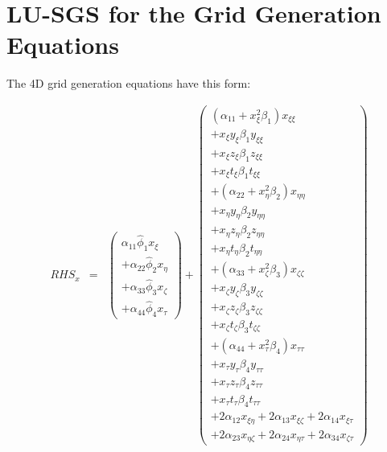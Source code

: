 \section{LU-SGS for the Grid Generation Equations}

The 4D grid generation equations have this form:

\begin{eqnarray}
RHS_x
&=&
\left(
\begin{array}{r}
\alpha_{11} \widehat{\phi}_1 x_{\xi} 
\\
+
\alpha_{22} \widehat{\phi}_2 x_{\eta} 
\\
+
\alpha_{33} \widehat{\phi}_3 x_{\zeta} 
\\
+
\alpha_{44} \widehat{\phi}_4 x_{\tau} 
\end{array}
\right)
+
\left(
\begin{array}{r}
\left(\alpha_{11} + x_{\xi}^2 \beta_1 \right) x_{\xi \xi}
\\
+ x_{\xi} y_{\xi} \beta_1 y_{\xi \xi} 
\\
+ x_{\xi} z_{\xi} \beta_1 z_{\xi \xi} 
\\
+ x_{\xi} t_{\xi} \beta_1 t_{\xi \xi} 
\\
+
\left(\alpha_{22} + x_{\eta}^2 \beta_2 \right) x_{\eta \eta}
\\
+ x_{\eta} y_{\eta} \beta_2 y_{\eta \eta} 
\\
+ x_{\eta} z_{\eta} \beta_2 z_{\eta \eta} 
\\
+ x_{\eta} t_{\eta} \beta_2 t_{\eta \eta} 
\\
+
\left(\alpha_{33} + x_{\zeta}^2 \beta_3 \right) x_{\zeta \zeta}
\\
+ x_{\zeta} y_{\zeta} \beta_3 y_{\zeta \zeta} 
\\
+ x_{\zeta} z_{\zeta} \beta_3 z_{\zeta \zeta} 
\\
+ x_{\zeta} t_{\zeta} \beta_3 t_{\zeta \zeta} 
\\
+
\left(\alpha_{44} + x_{\tau}^2 \beta_4 \right) x_{\tau \tau}
\\
+ x_{\tau} y_{\tau} \beta_4 y_{\tau \tau} 
\\
+ x_{\tau} z_{\tau} \beta_4 z_{\tau \tau} 
\\
+ x_{\tau} t_{\tau} \beta_4 t_{\tau \tau} 
\\
+ 2 \alpha_{12} x_{\xi \eta}
+ 2 \alpha_{13} x_{\xi \zeta}
+ 2 \alpha_{14} x_{\xi \tau}
\\
+ 2 \alpha_{23} x_{\eta \zeta}
+ 2 \alpha_{24} x_{\eta \tau}
+ 2 \alpha_{34} x_{\zeta \tau}
\end{array}
\right)
\nonumber
\end{eqnarray}

